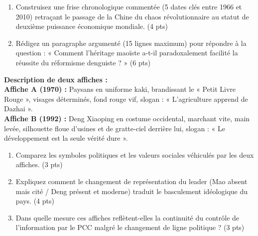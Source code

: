 \documentclass[11pt]{article}
\begin{document}
\begin{exercice}
\begin{enumerate}
\item Construisez une frise chronologique commentée (5 dates clés entre 1966 et 2010) retraçant le passage de la Chine du chaos révolutionnaire au statut de deuxième puissance économique mondiale. \hfill (4 pts)
\item Rédigez un paragraphe argumenté (15 lignes maximum) pour répondre à la question : « Comment l'héritage maoïste a-t-il paradoxalement facilité la réussite du réformisme denguiste ? » \hfill (6 pts)
\end{enumerate}
\end{exercice}

\begin{exercice}
\textbf{Description de deux affiches :}\\
\textbf{Affiche A (1970) :} Paysans en uniforme kaki, brandissant le « Petit Livre Rouge », visages déterminés, fond rouge vif, slogan : « L'agriculture apprend de Dazhai ».\\
\textbf{Affiche B (1992) :} Deng Xiaoping en costume occidental, marchant vite, main levée, silhouette floue d'usines et de gratte-ciel derrière lui, slogan : « Le développement est la seule vérité dure ».\\
\begin{enumerate}
\item Comparez les symboles politiques et les valeurs sociales véhiculés par les deux affiches. \hfill (3 pts)
\item Expliquez comment le changement de représentation du leader (Mao absent mais cité / Deng présent et moderne) traduit le basculement idéologique du pays. \hfill (4 pts)
\item Dans quelle mesure ces affiches reflètent-elles la continuité du contrôle de l'information par le PCC malgré le changement de ligne politique ? \hfill (3 pts)
\end{enumerate}
\end{exercice}
\end{document}

